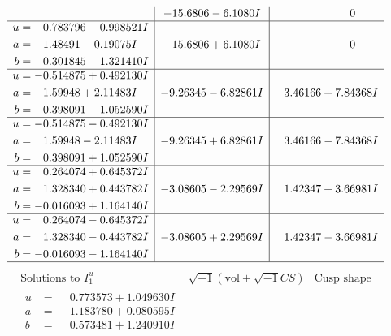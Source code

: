 \documentclass[1p]{elsarticle_modified}
\theoremstyle{definition}
\newcommand{\I}{\sqrt{-1}}
\begin{document}
$$\begin{array}{c|c|c}
 & -15.6806 - 6.1080 I & \phantom{-0.000000 } 0 \\ \hline\begin{aligned}
u &= -0.783796 - 0.998521 I \\
a &= -1.48491 - 0.19075 I \\
b &= -0.301845 - 1.321410 I\end{aligned}
 & -15.6806 + 6.1080 I & \phantom{-0.000000 } 0 \\ \hline\begin{aligned}
u &= -0.514875 + 0.492130 I \\
a &= \phantom{-}1.59948 + 2.11483 I \\
b &= \phantom{-}0.398091 - 1.052590 I\end{aligned}
 & -9.26345 - 6.82861 I & \phantom{-}3.46166 + 7.84368 I \\ \hline\begin{aligned}
u &= -0.514875 - 0.492130 I \\
a &= \phantom{-}1.59948 - 2.11483 I \\
b &= \phantom{-}0.398091 + 1.052590 I\end{aligned}
 & -9.26345 + 6.82861 I & \phantom{-}3.46166 - 7.84368 I \\ \hline\begin{aligned}
u &= \phantom{-}0.264074 + 0.645372 I \\
a &= \phantom{-}1.328340 + 0.443782 I \\
b &= -0.016093 + 1.164140 I\end{aligned}
 & -3.08605 - 2.29569 I & \phantom{-}1.42347 + 3.66981 I \\ \hline\begin{aligned}
u &= \phantom{-}0.264074 - 0.645372 I \\
a &= \phantom{-}1.328340 - 0.443782 I \\
b &= -0.016093 - 1.164140 I\end{aligned}
 & -3.08605 + 2.29569 I & \phantom{-}1.42347 - 3.66981 I\\
 \hline 
 \end{array}$$\newpage$$\begin{array}{c|c|c}  
\text{Solutions to }I^u_{1}& \I (\text{vol} + \sqrt{-1}CS) & \text{Cusp shape}\\
 \hline 
\begin{aligned}
u &= \phantom{-}0.773573 + 1.049630 I \\
a &= \phantom{-}1.183780 + 0.080595 I \\
b &= \phantom{-}0.573481 + 1.240910 I\end{aligned}

\end{array}$$
\end{document}

